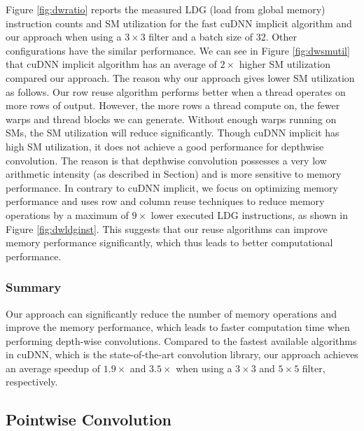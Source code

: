 Figure \ref{fig:dwratio} reports the measured LDG (load from global memory) instruction counts and SM utilization for the fast cuDNN implicit algorithm and our approach when using a $3 \times 3$ filter and a batch size of 32. Other configurations have the similar performance. 
We can see in Figure \ref{fig:dwsmutil} that cuDNN implicit algorithm has an average of $2\times$ higher SM utilization compared our approach.
The reason why our approach gives lower SM utilization as follows. 
Our row reuse algorithm performs better when a thread operates on more rows of output.
However, the more rows a thread compute on, the fewer warps and thread blocks we can generate. Without enough warps running on SMs, the SM utilization will reduce significantly.
Though cuDNN implicit has high SM utilization, it does not achieve a good performance for depthwise convolution. 
The reason is that depthwise convolution possesses a very low arithmetic intensity (as described in Section) and is more sensitive to memory performance.
In contrary to cuDNN implicit, we focus on optimizing memory performance and uses row and column reuse techniques to reduce memory operations by a maximum of $9\times$ lower executed LDG instructions, as shown in Figure \ref{fig:dwldginst}.
This suggests that our reuse algorithms can improve memory performance significantly, which thus leads to better computational performance.

\subsubsection{Summary}
Our approach can significantly reduce the number of memory operations and improve the memory performance, which leads to faster computation time when performing
depth-wise convolutions.  Compared to the fastest available algorithms in cuDNN, which is the state-of-the-art convolution library, our
approach achieves an average speedup of $1.9\times$ and $3.5\times$ when using a $3 \times 3$ and $5 \times 5$ filter, respectively.


\subsection{Pointwise Convolution}
\label{sec:pwconvexp}

